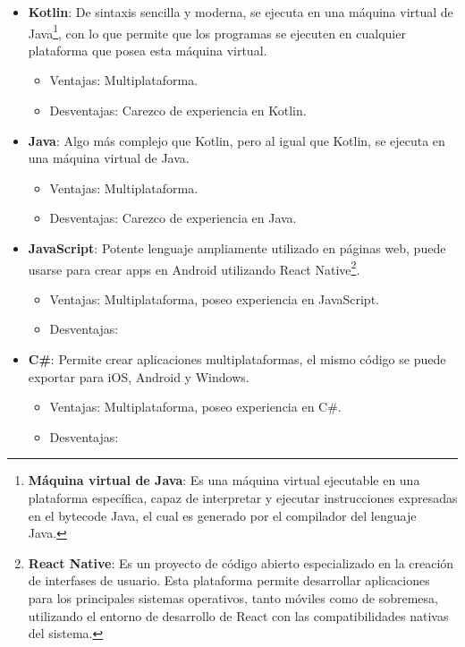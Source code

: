 \begin{itemize}

    \item \textbf{Kotlin}: De sintaxis sencilla y moderna, se ejecuta en una máquina virtual de Java\footnote{\textbf{Máquina virtual de Java}: Es una máquina virtual ejecutable en una plataforma específica, capaz de interpretar y ejecutar instrucciones expresadas en el bytecode Java, el cual es generado por el compilador del lenguaje Java.}, con lo que permite que los programas se ejecuten en cualquier plataforma que posea esta máquina virtual.
    \begin{itemize}
        \item Ventajas: Multiplataforma.
        \item Desventajas: Carezco de experiencia en Kotlin.
    \end{itemize}
    
    \item \textbf{Java}: Algo más complejo que Kotlin, pero al igual que Kotlin, se ejecuta en una máquina virtual de Java.
    \begin{itemize}
        \item Ventajas: Multiplataforma.
        \item Desventajas: Carezco de experiencia en Java.
    \end{itemize}
    
    \item \textbf{JavaScript}: Potente lenguaje ampliamente utilizado en páginas web, puede usarse para crear apps en Android utilizando React Native\footnote{\textbf{React Native}: Es un proyecto de código abierto especializado en la creación de interfases de usuario. Esta plataforma permite desarrollar aplicaciones para los principales sistemas operativos, tanto móviles como de sobremesa, utilizando el entorno de desarrollo de React con las compatibilidades nativas del sistema.}.
    \begin{itemize}
        \item Ventajas: Multiplataforma, poseo experiencia en JavaScript. 
        \item Desventajas:
    \end{itemize}
    
    \item \textbf{C\#}: Permite crear aplicaciones multiplataformas, el mismo código se puede exportar para iOS, Android y Windows.
    \begin{itemize}
        \item Ventajas: Multiplataforma, poseo experiencia en C\#. 
        \item Desventajas:
    \end{itemize}

\end{itemize}

